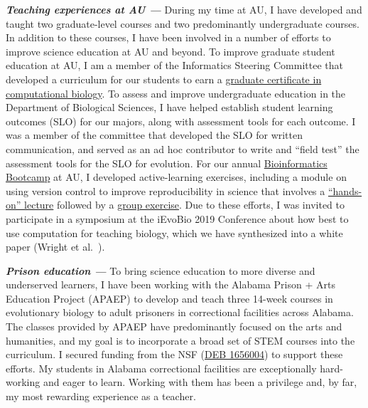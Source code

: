\textit{\textbf{Teaching experiences at AU ---}}
During my time at AU,
I have developed and taught two graduate-level courses
and two predominantly undergraduate courses.
In addition to these courses, I have been involved in a number of efforts to
improve science education at AU and beyond.
%
To improve graduate student education at AU,
I am a member of the Informatics Steering Committee that developed a
curriculum for our students to earn a
\href{http://bulletin.auburn.edu/thegraduateschool/graduatedegreesoffered/biologicalsciencesmsphd_major/computationalbiology_gradcert/}{graduate certificate in computational biology}.
To assess and improve undergraduate education in the Department of Biological
Sciences, I have helped establish student learning outcomes (SLO) for our
majors, along with assessment tools for each outcome.
I was a member of the committee that developed the SLO for written
communication, and served as an ad hoc contributor to write and ``field test''
the assessment tools for the SLO for evolution.
%
For our annual
\href{http://www.auburn.edu/cosam/bioinformatics/}{Bioinformatics Bootcamp}
at AU,
I developed active-learning exercises,
including a module on using version control to improve reproducibility in
science that involves a
\href{http://phyletica.org/slides/git-intro/}{``hands-on'' lecture}
followed by a
\href{https://github.com/joaks1/au-bootcamp-git-intro}{group exercise}.
Due to these efforts, I was invited to participate in a symposium at the
iEvoBio 2019 Conference about how best to use computation for teaching biology,
which we have synthesized into a
white paper
(Wright et al.\ \citeyear{Wright2019}).

\textit{\textbf{Prison education ---}}
To bring science education to more diverse and underserved learners,
I have been working with
the Alabama Prison + Arts Education Project (APAEP) to develop and teach three
14-week courses in evolutionary biology to adult prisoners in correctional
facilities across Alabama.
The classes provided by APAEP have predominantly focused on the
arts and humanities, and
my
goal is to incorporate a broad set of STEM courses into the
curriculum.
I secured funding from the NSF
(\href{https://www.nsf.gov/awardsearch/showAward?AWD_ID=1656004&HistoricalAwards=false}{DEB 1656004})
to support these efforts.
My students in Alabama correctional facilities are exceptionally hard-working
and eager to learn.
Working with them has been a privilege and, by far, my most rewarding
experience as a teacher.

